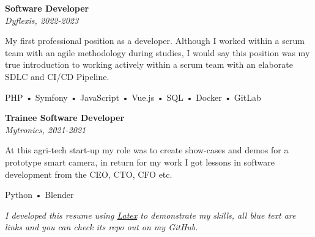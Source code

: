 \documentclass[11pt, twoside, a4paper, titlepage]{article}
\begin{document}
\begin{tcolorbox}[boxsep=0mm, left=0mm, right=0mm, top=0mm, bottom=0mm, height=23cm]
\begin{minipage}[t]{14cm}
\begin{tcolorbox}[grow to left by=0.0cm, colframe=white, colback=white, height=22.9cm]
			\vspace*{0.3cm}
			
			\textbf{Software Developer}\\
			\emph{Dyflexis, 2022-2023}\\
			\parbox{13cm}{My first professional position as a developer. Although I worked within a scrum team with an agile methodology during studies, I would say this position was my true introduction to working actively within a scrum team with an elaborate SDLC and CI/CD Pipeline.}
			\parbox{13cm}{ PHP • Symfony • JavaScript • Vue.js • SQL • Docker • GitLab }
			
			\vspace*{0.3cm}
			
			\textbf{Trainee Software Developer}\\
			\emph{Mytronics, 2021-2021}\\
			\parbox{13cm}{At this agri-tech start-up my role was to create show-cases and demos for a prototype smart camera, in return for my work I got lessons in software development from the CEO, CTO, CFO etc.}
			\parbox{13cm}{ Python • Blender }
		\end{tcolorbox}
	\end{minipage}
\end{tcolorbox}

\vspace*{-0.42cm}
\begin{center}
	\small
	\emph{ I developed this resume using 		\href{https://www.latex-project.org/}{Latex} 
		to demonstrate my skills, all blue text are links and you can check its repo out on my GitHub. }
\end{center}
\end{document}
